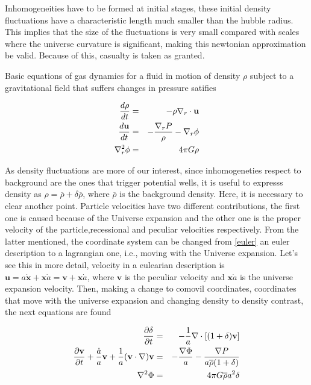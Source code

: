 Inhomogeneities have to be formed at initial stages, these initial density fluctuations 
have a characteristic length much smaller than the hubble radius. This implies that the
size of the fluctuations is very small compared with scales where the universe curvature 
is significant, making this newtonian approximation be valid. Because of this, casualty 
is taken as granted.

Basic equations of gas dynamics for a fluid in motion of density $\rho$ 
subject to a gravitational field that suffers changes in pressure satifies 

\begin{eqnarray}
\frac{d \rho}{d t}&=& -\rho \nabla_r\cdot \textbf{u} \nonumber\\
\frac{d \textbf{u}}{d t} &=& -\frac{\nabla_r P}{\rho}-\nabla_r\phi \nonumber\\
\nabla^2_r \phi & =& 4\pi G\rho 
\label{euler}
\end{eqnarray}

As density fluctuations are more of our interest, since inhomogeneties 
respect to background are the ones that trigger potential wells, it is
useful to expresss density as $\rho = \overline{\rho}+\delta\overline{\rho}$, where
$\overline{\rho}$ is the background density. 
Here, it is necessary to clear another point. Particle velocities have 
two different contributions, the first one is caused because of the Universe
expansion and the other one is the proper velocity of the particle,recessional 
and peculiar velocities respectively. 
From the latter mentioned, the coordinate system can be changed from \ref{euler}
an euler description to a lagrangian one, i.e., moving with the Universe expansion.
Let's see this in more detail, velocity in a eulearian description is 
$\textbf{u}= a\dot{\textbf{x}}+ \textbf{x}\dot{a} = \textbf{v}+\textbf{x}\dot{a}$, 
where $\textbf{v}$ is the peculiar velocity and $\textbf{x}\dot{a}$ is the universe 
expansion velocity. 
Then, making a change to comovil coordinates, coordinates that move with the universe
expansion and changing density to density contrast, the next equations are found

\begin{eqnarray}
\frac{\partial \delta}{\partial t} &=& -\frac{1}{a}\nabla\cdot[(1+\delta)\textbf{v}]\nonumber\\
\frac{\partial \textbf{v}}{\partial t}+\frac{\dot{a}}{a}\textbf{v}+\frac{1}{a}(\textbf{v}\cdot\nabla)\textbf{v}& = &
-\frac{\nabla \Phi}{a}-\frac{\nabla P}{a\overline{\rho}(1+\delta)}\nonumber\\
\nabla^2 \Phi &=& 4\pi G\overline{\rho}a^2\delta
\label{ec.movimiento}
\end{eqnarray}

